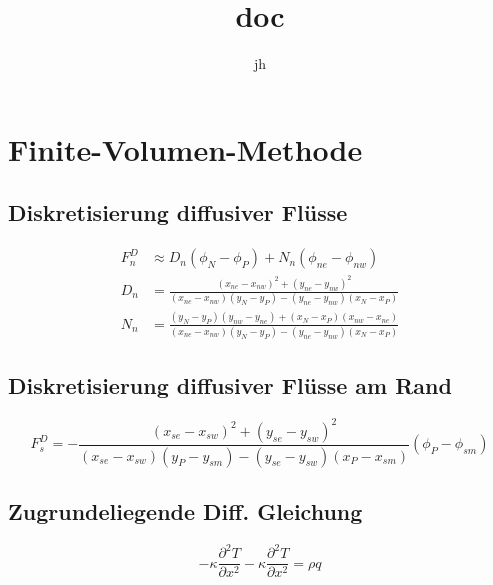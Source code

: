 \documentclass[10pt,a4paper]{article}
\title{doc}
\author{jh}
\begin{document}
\section{Finite-Volumen-Methode}
\subsection{Diskretisierung diffusiver Flüsse}

\begin{align}
F_n^D &\approx D_n ( \phi_N-\phi_P )+N_n(\phi_{ne} - \phi_{nw}) \\
D_n &= \frac{(x_{ne}-x_{nw})^2 +(y_{ne}-y_{nw})^2}{(x_{ne}-x_{nw})(y_N-y_P)-(y_{ne}-y_{nw})(x_N-x_P)} \\
N_n &= \frac{(y_N-y_P)(y_{nw}-y_{ne})+(x_N-x_P)(x_{nw}-x_{ne})}{(x_{ne}-x_{nw})(y_N-y_P)-(y_{ne}-y_{nw})(x_N-x_P)}
\end{align}
\subsection{Diskretisierung diffusiver Flüsse am Rand}
\begin{equation}
F_s^D = - \frac{(x_{se}-x_{sw})^2+(y_{se}-y_{sw})^2}{(x_{se}-x_{sw})(y_P-y_{sm})-(y_{se}-y_{sw})(x_P-x_{sm})}(\phi_P-\phi_{sm})
\end{equation}

\subsection{Zugrundeliegende Diff. Gleichung}

\begin{equation}
-\kappa \frac{\partial^2 T}{\partial x^2} -\kappa \frac{\partial^2 T}{\partial x^2} = \rho q 
\end{equation}
\end{document}
